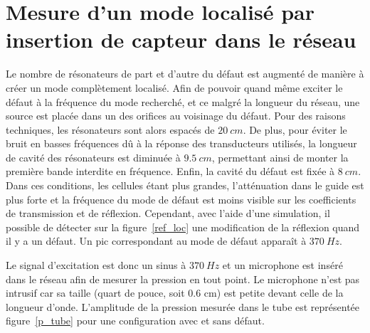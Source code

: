 \section{Mesure d'un mode localisé par insertion de capteur dans le réseau}



Le nombre de résonateurs de part et d'autre du défaut est augmenté de manière à créer un mode complètement localisé. Afin de pouvoir quand même exciter le défaut à la fréquence du mode recherché, et ce malgré la longueur du réseau, une source est placée dans un des orifices au voisinage du défaut. Pour des raisons techniques, les résonateurs sont alors espacés de $20~cm$. De plus, pour éviter le bruit en basses fréquences dû à la réponse des transducteurs utilisés, la longueur de cavité des résonateurs est diminuée à $9.5~cm$, permettant ainsi de monter la première bande interdite en fréquence. Enfin, la cavité du défaut est fixée à $8~cm$. Dans ces conditions, les cellules étant plus grandes, l'atténuation dans le guide est plus forte et la fréquence du mode de défaut est moins visible sur les coefficients de transmission et de réflexion. Cependant, avec l'aide d'une simulation, il possible de détecter sur la figure~\ref{ref_loc} une modification de la réflexion quand il y a un défaut. Un pic correspondant au mode de défaut apparaît à $370~Hz$.



 Le signal d'excitation est donc un sinus à $370~Hz$ et un microphone est inséré dans le réseau afin de mesurer la pression en tout point. Le microphone n'est pas intrusif car sa taille (quart de pouce, soit 0.6 cm) est petite devant celle de la longueur d'onde. L'amplitude de la pression mesurée dans le tube est représentée figure~\ref{p_tube} pour une configuration avec et sans défaut. 


